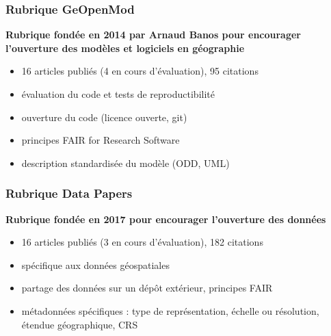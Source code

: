 \documentclass[english,10pt]{beamer}
\begin{document}
\begin{frame}
\frametitle{Rubrique GeOpenMod}

\textbf{Rubrique fondée en 2014 par Arnaud Banos pour encourager l'ouverture des modèles et logiciels en géographie} \cite{banos2014presentation}

\bigskip
\bigskip


\begin{itemize}
	\item 16 articles publiés (4 en cours d'évaluation), 95 citations
	\item évaluation du code et tests de reproductibilité
	\item ouverture du code (licence ouverte, git)
	\item principes FAIR for Research Software
	\item description standardisée du modèle (ODD, UML)
\end{itemize}


\end{frame}



\begin{frame}
\frametitle{Rubrique Data Papers}


\textbf{Rubrique fondée en 2017 pour encourager l'ouverture des données}

\cite{cybergeo2017presentation}

\bigskip
\bigskip


\begin{itemize}
	\item 16 articles publiés (3 en cours d'évaluation), 182 citations
	\item spécifique aux données géospatiales
	\item partage des données sur un dépôt extérieur, principes FAIR
	\item métadonnées spécifiques : type de représentation, échelle ou résolution, étendue géographique, CRS
\end{itemize}

\end{frame}
\end{document}
